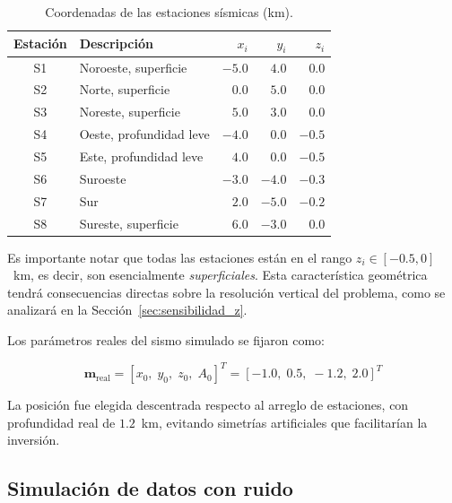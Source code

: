 \documentclass[12pt, a4paper]{article}
\begin{document}
\begin{table}[H]
    \centering
    \caption{Coordenadas de las estaciones sísmicas (km).}
    \label{tab:estaciones}
    \begin{tabular}{clrrr}
        \toprule
        \textbf{Estación} & \textbf{Descripción} &
        $x_i$ & $y_i$ & $z_i$ \\
        \midrule
        S1 & Noroeste, superficie       & $-5.0$ & $ 4.0$ & $ 0.0$ \\
        S2 & Norte, superficie          & $ 0.0$ & $ 5.0$ & $ 0.0$ \\
        S3 & Noreste, superficie        & $ 5.0$ & $ 3.0$ & $ 0.0$ \\
        S4 & Oeste, profundidad leve    & $-4.0$ & $ 0.0$ & $-0.5$ \\
        S5 & Este, profundidad leve     & $ 4.0$ & $ 0.0$ & $-0.5$ \\
        S6 & Suroeste                   & $-3.0$ & $-4.0$ & $-0.3$ \\
        S7 & Sur                        & $ 2.0$ & $-5.0$ & $-0.2$ \\
        S8 & Sureste, superficie        & $ 6.0$ & $-3.0$ & $ 0.0$ \\
        \bottomrule
    \end{tabular}
\end{table}

Es importante notar que todas las estaciones están en el rango
$z_i \in [-0.5, 0]$~km, es decir, son esencialmente \emph{superficiales}.
Esta característica geométrica tendrá consecuencias directas sobre la
resolución vertical del problema, como se analizará en la
Sección~\ref{sec:sensibilidad_z}.

Los parámetros reales del sismo simulado se fijaron como:

\begin{equation}
    \mathbf{m}_{\text{real}} =
    [x_0,\; y_0,\; z_0,\; A_0]^T =
    [-1.0,\; 0.5,\; -1.2,\; 2.0]^T
    \label{eq:m_real}
\end{equation}

La posición fue elegida descentrada respecto al arreglo de estaciones,
con profundidad real de $1.2$~km, evitando simetrías artificiales que
facilitarían la inversión.

\subsection{Simulación de datos con ruido}
\end{document}
